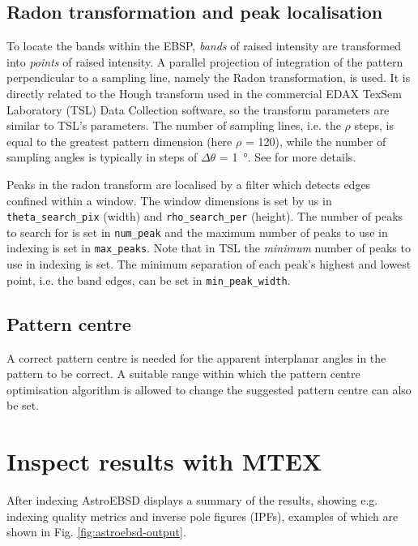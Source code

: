 \documentclass[11pt, twoside]{article}
\begin{document}
\subsection{Radon transformation and peak localisation}

To locate the bands within the EBSP, \textit{bands} of raised intensity are transformed into \textit{points} of raised intensity. A parallel projection of integration of the pattern perpendicular to a sampling line, namely the Radon transformation, is used. It is directly related to the Hough transform used in the commercial EDAX TexSem Laboratory (TSL) Data Collection software, so the transform parameters are similar to TSL's parameters. The number of sampling lines, i.e. the $\rho$ steps, is equal to the greatest pattern dimension (here $\rho$ = 120), while the number of sampling angles is typically in steps of $\Delta\theta$ = \SI{1}{\degree}. See \cite{Britton2018} for more details.

Peaks in the radon transform are localised by a filter which detects edges confined within a window. The window dimensions is set by us in \texttt{theta\_search\_pix} (width) and \texttt{rho\_search\_per} (height). The number of peaks to search for is set in \texttt{num\_peak} and the maximum number of peaks to use in indexing is set in \texttt{max\_peaks}. Note that in TSL the \textit{minimum} number of peaks to use in indexing is set. The minimum separation of each peak's highest and lowest point, i.e. the band edges, can be set in \texttt{min\_peak\_width}.

\subsection{Pattern centre}

A correct pattern centre is needed for the apparent interplanar angles in the pattern to be correct. A suitable range within which the pattern centre optimisation algorithm is allowed to change the suggested pattern centre can also be set.


\section{Inspect results with MTEX}

After indexing AstroEBSD displays a summary of the results, showing e.g. indexing quality metrics and inverse pole figures (IPFs), examples of which are shown in Fig. \ref{fig:astroebsd-output}.
\end{document}
